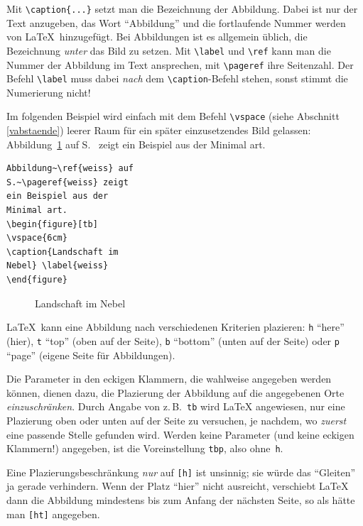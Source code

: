 Mit \verb|\caption{...}| setzt man die Bezeichnung der Abbildung.
Dabei ist nur der Text anzugeben, das Wort "`Abbildung"' und die
fortlaufende Nummer werden von \LaTeX\ hinzugefügt.
Bei Abbildungen ist es allgemein üblich, die Bezeichnung
\emph{unter} das Bild zu setzen.
Mit \verb|\label| und \verb|\ref| kann man die Nummer der
Abbildung im Text ansprechen, mit \verb|\pageref| ihre Seitenzahl.
Der Befehl \verb:\label: muss dabei \emph{nach} dem \verb:\caption:-Befehl
stehen, sonst stimmt die Numerierung nicht!

Im folgenden Beispiel wird einfach mit dem Befehl \verb|\vspace|
(siehe Abschnitt \ref{vabstaende})
leerer Raum für ein später einzusetzendes Bild gelassen:
\exa
Abbildung~\ref{weiss} auf S.~\pageref{weiss} zeigt ein
Beispiel aus der Minimal art.
\exb
\begin{verbatim}
Abbildung~\ref{weiss} auf
S.~\pageref{weiss} zeigt
ein Beispiel aus der 
Minimal art.
\begin{figure}[tb]
\vspace{6cm}
\caption{Landschaft im
Nebel} \label{weiss}
\end{figure}
\end{verbatim}
\exc
\begin{figure}[tb]
\vspace{6cm}
\caption{Landschaft im
Nebel} \label{weiss}
\end{figure}

\LaTeX\ kann eine Abbildung nach verschiedenen Kriterien plazieren:
\texttt{h} "`here"' (hier),
\texttt{t} "`top"' (oben auf der Seite), \texttt{b} "`bottom"' (unten
auf der Seite) oder \texttt{p} "`page"' (eigene Seite für
Abbildungen).

Die Parameter in den eckigen Klammern, die wahlweise angegeben
werden können, dienen dazu, die Plazierung der Abbildung auf die
angegebenen Orte \emph{einzuschränken}.  Durch Angabe von
z.\,B.\ \texttt{tb}
wird \LaTeX{} angewiesen, nur eine Plazierung oben oder unten auf der
Seite zu versuchen, je nachdem,
wo \emph{zuerst} eine passende Stelle gefunden wird.
Werden keine Parameter (und keine eckigen
Klammern!) angegeben, ist die Voreinstellung \texttt{tbp},
also ohne~\texttt{h}.

Eine Plazierungsbeschränkung \emph{nur} auf \texttt{[h]} ist unsinnig;
sie würde das "`Gleiten"' ja gerade verhindern.
Wenn der Platz "`hier"' nicht ausreicht, 
verschiebt \LaTeX{} dann die Abbildung mindestens 
bis zum Anfang der nächsten Seite, so als hätte man \texttt{[ht]} angegeben.

